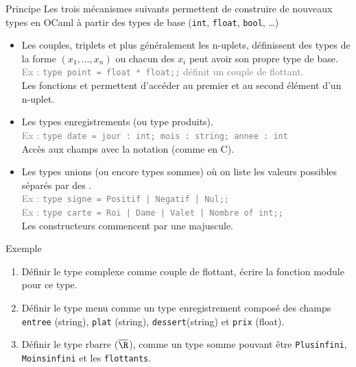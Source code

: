 \documentclass[10pt]{beamer}
\begin{document}
\begin{frame}{\Ctitle}{\stitle}
	\begin{block}{Principe}
		Les trois mécanismes suivants permettent de construire de nouveaux types en OCaml à partir des types de base ({\tt int}, {\tt float}, {\tt bool}, \dots)
		\begin{itemize}
			\item<2-> Les couples, triplets et plus généralement les n-uplets, définissent des types de la forme $(x_1,\dots,x_n)$ ou chacun des $x_i$ peut avoir son propre type de base. \\
				\onslide<3->\textcolor{gray}{Ex : \texttt{type point = float * float;;} définit un couple de flottant.}\\
				\onslide<4->Les fonctions  et  permettent d'accéder au premier et au second élément d'un n-uplet.
			\item<5-> Les types enregistrements (ou type produits).\\
				\onslide<6->\textcolor{gray}{Ex : \texttt{type date = {jour : int; mois : string; annee : int}}}\\
				\onslide<7-> Accès aux champs avec la notation  (comme en C).
			\item<6-> Les types unions (ou encore types sommes) où on liste les valeurs possibles séparés par des \kw{|}. \\
				\onslide<7->\textcolor{gray}{Ex : \texttt{type signe = Positif | Negatif | Nul;;}}\\
				\onslide<8->\textcolor{gray}{Ex : \texttt{type carte = Roi | Dame | Valet | Nombre of int;;}}\\
				\onslide<9->\textcolor{BrickRed}{\small \danger \;} Les constructeurs commencent par une majuscule.
		\end{itemize}
	\end{block}
\end{frame}

\begin{frame}{\Ctitle}{\stitle}
	\begin{exampleblock}{Exemple}
		\begin{enumerate}
			\item<1-> Définir le type complexe comme couple de flottant, écrire la fonction module pour ce type.
			\item<2-> Définir le type menu comme un type enregistrement composé des champs {\tt entree} (string), {\tt plat} (string), {\tt dessert}(string) et {\tt prix} (float).
			\item<3-> Définir le type rbarre ($\overline{\R}$), comme un type somme pouvant être {\tt Plusinfini}, {\tt Moinsinfini} et les {\tt flottants}.
		\end{enumerate}
	\end{exampleblock}
\end{frame}
\end{document}
